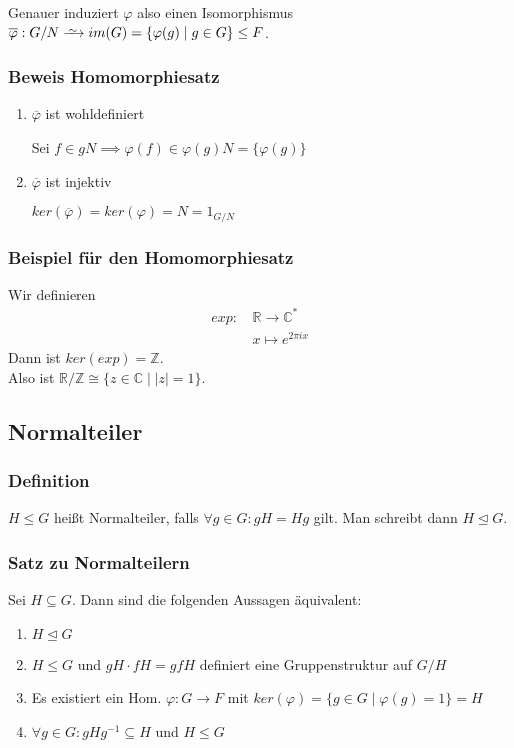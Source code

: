 \documentclass[12pt, german]{article}
\newcommand\iso{\xrightarrow{
		\,\smash{\raisebox{-0.65ex}{\ensuremath{\scriptstyle\sim}}}\,}}
\begin{document}
	Genauer induziert $\varphi$ also einen Isomorphismus $\overline{\varphi}: G/N \iso im(G) = \{\varphi(g) \mid g \in G\} \leq F$.
	
	\subsubsection{Beweis Homomorphiesatz}
	\begin{enumerate}[label=\arabic*)]
		\item $\overline{\varphi}$ ist wohldefiniert ~\par
		Sei $f\in gN \implies \varphi(f) \in \varphi(g)N = \{\varphi(g)\}$
		
		\item $\overline{\varphi}$ ist injektiv ~\par
		$ker(\overline{\varphi}) = ker(\varphi) = N = 1_{G/N}$
	\end{enumerate}
	
	\subsubsection{Beispiel für den Homomorphiesatz}
	Wir definieren 
	\begin{align*}
		exp: &\,\mathbb{R} \to \mathbb{C}^\ast\\
		&\, x \mapsto e^{2\pi i x}
	\end{align*}
	Dann ist $ker(exp) = \mathbb Z $.\\ 
	Also ist $\mathbb R / \mathbb Z \cong \{z \in \mathbb C \mid |z| = 1\}$.
	
	
	
	\subsection{Normalteiler}		
	\subsubsection{Definition}
	$H \leq G$ hei\ss t Normalteiler, falls $\forall g \in G : gH = Hg$ gilt.
	Man schreibt dann $H\trianglelefteq G$. 
	
	\subsubsection{Satz zu Normalteilern}
	Sei $H \subseteq G$. Dann sind die folgenden Aussagen äquivalent: 
	\begin{enumerate}[label=\arabic*)]
		\item $H\trianglelefteq G$
		\item $H \leq G$ und $gH \cdot fH = gfH$ definiert eine Gruppenstruktur auf $G/H$
		\item Es existiert ein Hom. $\varphi: G \to F$ mit $ker(\varphi) = \{g \in G \mid \varphi(g)= 1\} = H$
		\item $\forall g \in G : gHg^{-1} \subseteq H$ und $H \leq G$
	\end{enumerate}
	
\end{document}
